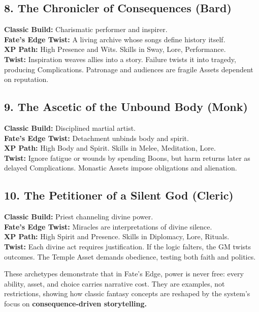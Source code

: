 \documentclass[11pt]{article}
\begin{document}
\subsection{8. The Chronicler of Consequences (Bard)}

\textbf{Classic Build:} Charismatic performer and inspirer.\\
\textbf{Fate’s Edge Twist:} A living archive whose songs define history itself.\\
\textbf{XP Path:} High Presence and Wits. Skills in Sway, Lore, Performance.\\
\textbf{Twist:} Inspiration weaves allies into a story. Failure twists it into tragedy,
producing Complications. Patronage and audiences are fragile Assets dependent on reputation.

\subsection{9. The Ascetic of the Unbound Body (Monk)}

\textbf{Classic Build:} Disciplined martial artist.\\
\textbf{Fate’s Edge Twist:} Detachment unbinds body and spirit.\\
\textbf{XP Path:} High Body and Spirit. Skills in Melee, Meditation, Lore.\\
\textbf{Twist:} Ignore fatigue or wounds by spending Boons, but harm
returns later as delayed Complications. Monastic Assets impose obligations and alienation.

\subsection{10. The Petitioner of a Silent God (Cleric)}

\textbf{Classic Build:} Priest channeling divine power.\\
\textbf{Fate’s Edge Twist:} Miracles are interpretations of divine silence.\\
\textbf{XP Path:} High Spirit and Presence. Skills in Diplomacy, Lore, Rituals.\\
\textbf{Twist:} Each divine act requires justification. If the logic falters, the GM twists
outcomes. The Temple Asset demands obedience, testing both faith and politics.

\bigskip

\noindent
These archetypes demonstrate that in Fate’s Edge, power is never free: every
ability, asset, and choice carries narrative cost. They are examples, not
restrictions, showing how classic fantasy concepts are reshaped by the
system’s focus on \textbf{consequence-driven storytelling.}
\end{document}
